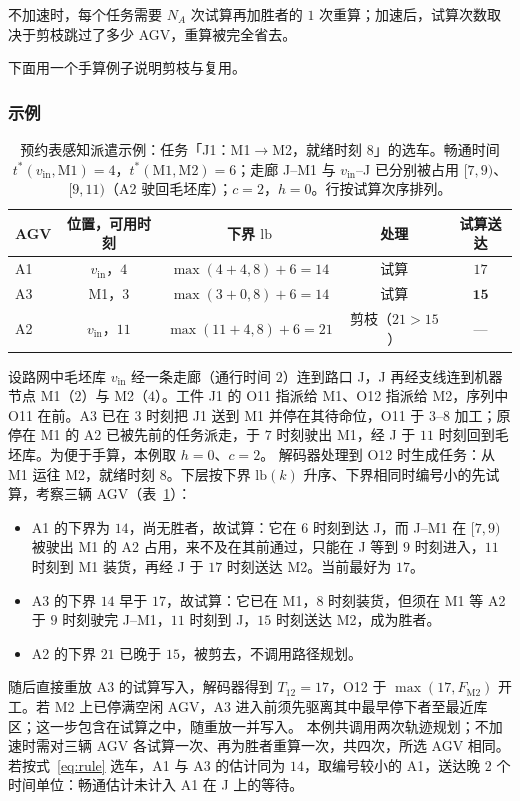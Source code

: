 \documentclass[manuscript,screen,review]{acmart}
\begin{document}
不加速时，每个任务需要 $N_A$ 次试算再加胜者的 $1$ 次重算；加速后，试算次数取决于剪枝跳过了多少 AGV，重算被完全省去。

下面用一个手算例子说明剪枝与复用。

\subsubsection{示例}
\label{sec:planner_example}

\begin{table}[t]
\caption{预约表感知派遣示例：任务「J1：M1$\to$M2，就绪时刻 $8$」的选车。畅通时间 $t^{*}(v_{\mathrm{in}},\mathrm{M1})=4$，$t^{*}(\mathrm{M1},\mathrm{M2})=6$；走廊 J--M1 与 $v_{\mathrm{in}}$--J 已分别被占用 $[7,9)$、$[9,11)$（A2 驶回毛坯库）；$c=2$，$h=0$。行按试算次序排列。}
\label{tab:dispatch_example}
\footnotesize
\begin{tabular}{@{}lcccc@{}}
\toprule
AGV & 位置，可用时刻 & 下界 $\mathrm{lb}$ & 处理 & 试算送达 \\
\midrule
A1 & $v_{\mathrm{in}}$，$4$ & $\max(4+4,8)+6=14$ & 试算 & $17$ \\
A3 & M1，$3$ & $\max(3+0,8)+6=14$ & 试算 & $\mathbf{15}$ \\
A2 & $v_{\mathrm{in}}$，$11$ & $\max(11+4,8)+6=21$ & 剪枝（$21>15$） & --- \\
\bottomrule
\end{tabular}
\end{table}

设路网中毛坯库 $v_{\mathrm{in}}$ 经一条走廊（通行时间 $2$）连到路口 J，J 再经支线连到机器节点 M1（$2$）与 M2（$4$）。工件 J1 的 O11 指派给 M1、O12 指派给 M2，序列中 O11 在前。A3 已在 $3$ 时刻把 J1 送到 M1 并停在其待命位，O11 于 $3$--$8$ 加工；原停在 M1 的 A2 已被先前的任务派走，于 $7$ 时刻驶出 M1，经 J 于 $11$ 时刻回到毛坯库。为便于手算，本例取 $h=0$、$c=2$。
解码器处理到 O12 时生成任务：从 M1 运往 M2，就绪时刻 $8$。下层按下界 $\mathrm{lb}(k)$ 升序、下界相同时编号小的先试算，考察三辆 AGV（表~\ref{tab:dispatch_example}）：
\begin{itemize}[leftmargin=*,topsep=2pt,itemsep=1pt]
  \item A1 的下界为 $14$，尚无胜者，故试算：它在 $6$ 时刻到达 J，而 J--M1 在 $[7,9)$ 被驶出 M1 的 A2 占用，来不及在其前通过，只能在 J 等到 $9$ 时刻进入，$11$ 时刻到 M1 装货，再经 J 于 $17$ 时刻送达 M2。当前最好为 $17$。
  \item A3 的下界 $14$ 早于 $17$，故试算：它已在 M1，$8$ 时刻装货，但须在 M1 等 A2 于 $9$ 时刻驶完 J--M1，$11$ 时刻到 J，$15$ 时刻送达 M2，成为胜者。
  \item A2 的下界 $21$ 已晚于 $15$，被剪去，不调用路径规划。
\end{itemize}
随后直接重放 A3 的试算写入，解码器得到 $T_{12}=17$，O12 于 $\max(17,F_{\mathrm{M2}})$ 开工。若 M2 上已停满空闲 AGV，A3 进入前须先驱离其中最早停下者至最近库区；这一步包含在试算之中，随重放一并写入。
本例共调用两次轨迹规划；不加速时需对三辆 AGV 各试算一次、再为胜者重算一次，共四次，所选 AGV 相同。若按式~\eqref{eq:rule} 选车，A1 与 A3 的估计同为 $14$，取编号较小的 A1，送达晚 $2$ 个时间单位：畅通估计未计入 A1 在 J 上的等待。
\end{document}
